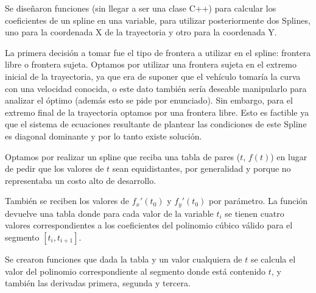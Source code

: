 		Se dise\~naron funciones (sin llegar a ser una clase C++) para calcular los coeficientes de un spline en una variable, para utilizar posteriormente dos Splines, uno para la coordenada X de la trayectoria y otro para la coordenada Y.

		La primera decisi\'on a tomar fue el tipo de frontera a utilizar en el spline: frontera libre o frontera sujeta. Optamos por utilizar una frontera sujeta en el extremo inicial de la trayectoria, ya que era de suponer que el veh\'iculo tomar\'ia la curva con una velocidad conocida, o este dato tambi\'en ser\'ia \' deseable manipularlo para analizar el \'optimo (adem\'as esto se pide por enunciado).
		Sin embargo, para el extremo final de la trayectoria optamos por una frontera libre. Esto es factible ya que el sistema de ecuaciones resultante de plantear las condiciones de este Spline es diagonal dominante y por lo tanto existe soluci\'on.

		Optamos por realizar un spline que reciba una tabla de pares ($t$, $f(t)$) en lugar de pedir que los valores de $t$ sean equidistantes, por generalidad y porque no representaba un costo alto de desarrollo.

		Tambi\'en se reciben los valores de $f_x'(t_0)$ y $f_y'(t_0)$ por par\'ametro. La funci\'on devuelve una tabla donde para cada valor de la variable $t_i$ se tienen cuatro valores correspondientes a los coeficientes del polinomio c\'ubico v\'alido para el segmento $[t_i, t_{i+1}]$.
		
		Se crearon funciones que dada la tabla y un valor cualquiera de $t$ se calcula el valor del polinomio correspondiente al segmento donde est\'a contenido $t$, y tambi\'en las derivadas primera, segunda y tercera.


